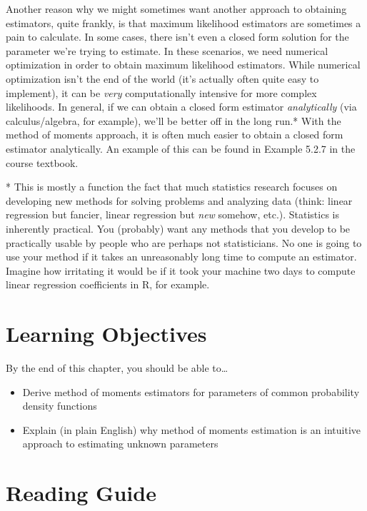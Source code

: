 \documentclass[
  letterpaper,
  DIV=11,
  numbers=noendperiod]{scrreprt}
\begin{document}
Another reason why we might sometimes want another approach to obtaining
estimators, quite frankly, is that maximum likelihood estimators are
sometimes a pain to calculate. In some cases, there isn't even a closed
form solution for the parameter we're trying to estimate. In these
scenarios, we need numerical optimization in order to obtain maximum
likelihood estimators. While numerical optimization isn't the end of the
world (it's actually often quite easy to implement), it can be
\emph{very} computationally intensive for more complex likelihoods. In
general, if we can obtain a closed form estimator \emph{analytically}
(via calculus/algebra, for example), we'll be better off in the long
run.* With the method of moments approach, it is often much easier to
obtain a closed form estimator analytically. An example of this can be
found in Example 5.2.7 in the course textbook.

* This is mostly a function the fact that much statistics research
focuses on developing new methods for solving problems and analyzing
data (think: linear regression but fancier, linear regression but
\emph{new} somehow, etc.). Statistics is inherently practical. You
(probably) want any methods that you develop to be practically usable by
people who are perhaps not statisticians. No one is going to use your
method if it takes an unreasonably long time to compute an estimator.
Imagine how irritating it would be if it took your machine two days to
compute linear regression coefficients in R, for example.

\hypertarget{learning-objectives-2}{%
\section{Learning Objectives}\label{learning-objectives-2}}

By the end of this chapter, you should be able to\ldots{}

\begin{itemize}
\item
  Derive method of moments estimators for parameters of common
  probability density functions
\item
  Explain (in plain English) why method of moments estimation is an
  intuitive approach to estimating unknown parameters
\end{itemize}

\hypertarget{reading-guide-2}{%
\section{Reading Guide}\label{reading-guide-2}}
\end{document}
